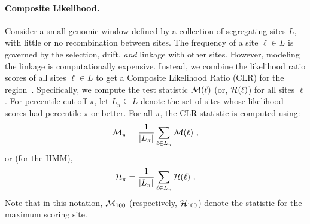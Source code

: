 \documentclass[11pt]{article}
\begin{document}


\paragraph{Composite Likelihood.}
Consider a small genomic window defined by a collection of segregating
sites $L$, with little or no recombination between sites. The
frequency of a site $\ell \in L$ is governed by the selection, drift,
\emph{and} linkage with other sites. However, modeling the linkage is
computationally expensive. Instead, we combine the likelihood ratio
scores of all sites $\ell \in L$ to get a Composite Likelihood Ratio
(CLR) for the
region~\cite{nielsen2005genomic,williamson2007localizing,vitti2013detecting}.
Specifically, we compute the test statistic ${\cal M}(\ell)$ (or,
${\cal H}(\ell)$) for all sites $\ell$. For percentile cut-off $\pi$,
let $L_{\pi}\subseteq L$ denote the set of sites whose likelihood
scores had percentile $\pi$ or better. For all $\pi$, the CLR
statistic is computed using:
\begin{equation}
 {\cal M}_{\pi} = \frac{1}{|L_{\pi}|}\sum_{\ell \in L_{\pi}} {\cal M}(\ell)\ ,
  \label{eq:pihmm}
\end{equation}
or (for the HMM),
\begin{equation}
  {\cal H}_{\pi} = \frac{1}{|L_{\pi}|}\sum_{\ell \in L_{\pi}} {\cal H}(\ell)\ .
  \label{eq:pihmm}
\end{equation}
Note that in this notation, ${\cal M}_{100}$ (respectively, ${\cal
  H}_{100}$) denote the statistic for the maximum scoring site.
\end{document}
